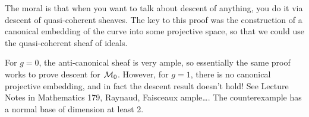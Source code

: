  \begin{remark}
   The moral is that when you want to talk about descent of anything, you do it via
   descent of quasi-coherent sheaves. The key to this proof was the construction of a
   canonical embedding of the curve into some projective space, so that we could use the
   quasi-coherent sheaf of ideals.

   For $g=0$, the anti-canonical sheaf is very ample, so essentially the same proof works
   to prove descent for $\mathcal{M}_0$. However, for $g=1$, there is no canonical projective
   embedding, and in fact the descent result doesn't hold! See Lecture Notes in
   Mathematics 179, Raynaud, Faisceaux ample\dots. The counterexample has a normal base
   of dimension at least 2.
 \end{remark}
